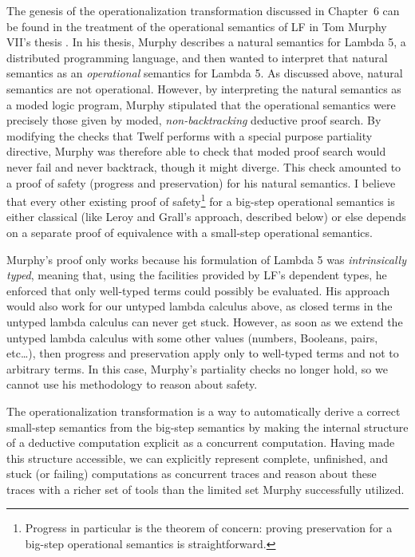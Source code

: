 The genesis of the operationalization transformation discussed in
Chapter~6 can be found in the treatment of the operational semantics
of LF in Tom Murphy VII's thesis \cite{murphy08modal}. In his thesis,
Murphy describes a natural semantics for Lambda 5, a distributed
programming language, and then wanted to interpret that natural
semantics as an {\it operational} semantics for Lambda 5. As discussed
above, natural semantics are not operational. However, by interpreting
the natural semantics as a moded logic program, Murphy stipulated that
the operational semantics were precisely those given by moded, {\it
  non-backtracking} deductive proof search. By modifying the checks
that Twelf performs with a special purpose partiality directive,
Murphy was therefore able to check that moded proof search would never
fail and never backtrack, though it might diverge. This check amounted
to a proof of safety (progress and preservation) for his natural
semantics. I believe that every other existing proof of
safety\footnote{Progress in particular is the theorem of concern:
  proving preservation for a big-step operational semantics is
  straightforward.} for a big-step operational semantics is either
classical (like Leroy and Grall's approach, described
below) or else depends on a
separate proof of equivalence with a small-step operational semantics.

Murphy's proof only works because his formulation of Lambda 5 was {\it
  intrinsically typed}, meaning that, using the facilities provided by
LF's dependent types, he enforced that only well-typed terms could
possibly be evaluated. His approach would also work for our untyped
lambda calculus above, as closed terms in the untyped lambda calculus
can never get stuck. However, as soon as we extend the untyped lambda
calculus with some other values (numbers, Booleans, pairs, etc\ldots),
then progress and preservation apply only to well-typed terms and not
to arbitrary terms. In this case, Murphy's partiality checks no longer
hold, so we cannot use his methodology to reason about safety.

The operationalization transformation is a way to automatically derive
a correct small-step semantics from the big-step semantics by making
the internal structure of a deductive computation explicit as a
concurrent computation. Having made this structure accessible, we
can explicitly represent complete, unfinished, and stuck (or failing)
computations as concurrent traces and reason about these traces with a
richer set of tools than the limited set Murphy successfully utilized.

